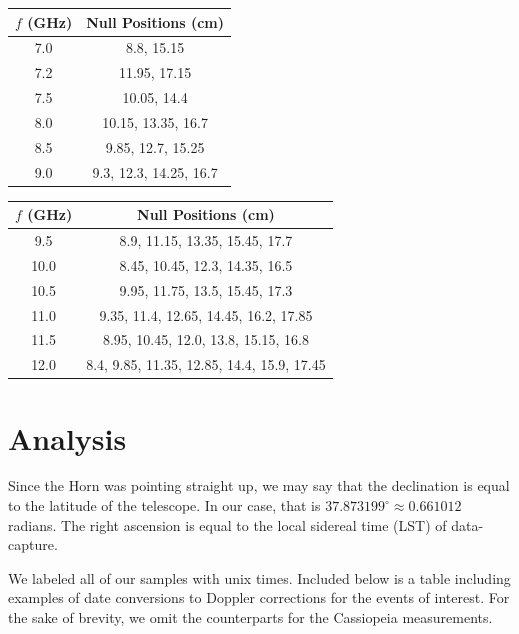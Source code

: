 \documentclass[12pt]{article}
\begin{document}
\begin{center}
 \begin{tabular}{||c c||} 
 \hline
 $f$ (GHz) & Null Positions (cm)\\ [0.5ex] 
 \hline
 7.0 & 8.8, 15.15 \\ 
 \hline
 7.2 & 11.95, 17.15 \\
 \hline
 7.5 & 10.05, 14.4 \\ 
 \hline
 8.0 & 10.15, 13.35, 16.7 \\
 \hline
 8.5 & 9.85, 12.7, 15.25 \\
 \hline 
 9.0 & 9.3, 12.3, 14.25, 16.7 \\ [1ex] 
 \hline
\end{tabular}
 \begin{tabular}{||c c||} 
 \hline
 $f$ (GHz) & Null Positions (cm)\\ [0.5ex] 
 \hline
 9.5 & 8.9, 11.15, 13.35, 15.45, 17.7 \\ 
 \hline
 10.0 & 8.45, 10.45, 12.3, 14.35, 16.5 \\
 \hline
 10.5 & 9.95, 11.75, 13.5, 15.45, 17.3 \\
 \hline
 11.0 & 9.35, 11.4, 12.65, 14.45, 16.2, 17.85 \\
 \hline
 11.5 & 8.95, 10.45, 12.0, 13.8, 15.15, 16.8 \\
 \hline
 12.0 & 8.4, 9.85, 11.35, 12.85, 14.4, 15.9, 17.45 \\ [1ex] 
 \hline
\end{tabular}
\end{center}

\section{Analysis}




Since the Horn was pointing straight up, we may say that the declination is equal to the latitude of the telescope. In our case, that is $37.873199^\circ \approx 0.661012$ radians. The right ascension is equal to the local sidereal time (LST) of data-capture.


We labeled all of our samples with unix times. Included below is a table including examples of date conversions to Doppler corrections for the events of interest. For the sake of brevity, we omit the counterparts for the Cassiopeia measurements.
\end{document}
